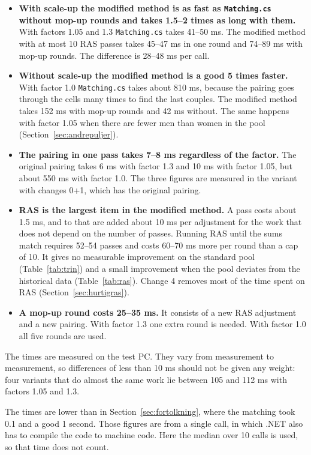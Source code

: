 \documentclass[12pt,a4paper]{article}
\newcommand{\kode}[1]{\texttt{#1}}
\begin{document}
\begin{itemize}
\item \textbf{With scale-up the modified method is as fast as \kode{Matching.cs} without mop-up
rounds and takes 1.5--2 times as long with them.} With factors 1.05 and 1.3 \kode{Matching.cs}
takes 41--50 ms. The modified method with at most 10 RAS passes takes 45--47 ms in one round and
74--89 ms with mop-up rounds. The difference is 28--48 ms per call.
\item \textbf{Without scale-up the modified method is a good 5 times faster.} With factor 1.0
\kode{Matching.cs} takes about 810 ms, because the pairing goes through the cells many times to
find the last couples. The modified method takes 152 ms with mop-up rounds and 42 ms without. The
same happens with factor 1.05 when there are fewer men than women in the pool
(Section~\ref{sec:andrepuljer}).
\item \textbf{The pairing in one pass takes 7--8 ms regardless of the factor.} The original pairing
takes 6 ms with factor 1.3 and 10 ms with factor 1.05, but about 550 ms with factor 1.0. The three
figures are measured in the variant with changes 0+1, which has the original pairing.
\item \textbf{RAS is the largest item in the modified method.} A pass costs about 1.5 ms, and to
that are added about 10 ms per adjustment for the work that does not depend on the number of
passes. Running RAS until the sums match requires 52--54 passes and costs 60--70 ms more per round
than a cap of 10. It gives no measurable improvement on the standard pool (Table~\ref{tab:trin})
and a small improvement when the pool deviates from the historical data (Table~\ref{tab:ras}).
Change 4 removes most of the time spent on RAS (Section~\ref{sec:hurtigras}).
\item \textbf{A mop-up round costs 25--35 ms.} It consists of a new RAS adjustment and a new
pairing. With factor 1.3 one extra round is needed. With factor 1.0 all five rounds are used.
\end{itemize}

The times are measured on the test PC. They vary from measurement to measurement, so differences of
less than 10 ms should not be given any weight: four variants that do almost the same work lie
between 105 and 112 ms with factors 1.05 and 1.3.

The times are lower than in Section~\ref{sec:fortolkning}, where the matching took 0.1 and a good
1 second. Those figures are from a single call, in which .NET also has to compile the code to
machine code. Here the median over 10 calls is used, so that time does not count.
\end{document}

